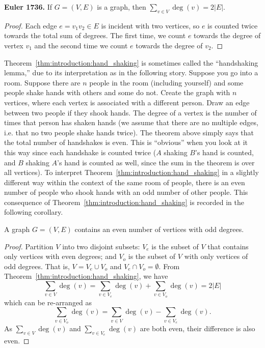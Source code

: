 \begin{theorem}
\label{thm:introduction:degree_sum}
\label{thm:introduction:hand_shaking}
\textbf{Euler 1736.}
If $G = (V, E)$ is a graph, then $\sum_{v \in V} \deg(v) = 2 |E|$.
\end{theorem}

\begin{proof}
Each edge $e = v_1 v_2 \in E$ is incident with two vertices, so $e$ is
counted twice towards the total sum of degrees. The first time, we
count $e$ towards the degree of vertex $v_1$ and the second time we
count $e$ towards the degree of $v_2$.
\end{proof}

Theorem~\ref{thm:introduction:hand_shaking} is sometimes called the
``handshaking lemma,'' due to its interpretation as in the following
story. Suppose you go into a room. Suppose there are $n$ people in the
room (including yourself) and some people shake hands with others and
some do not. Create the graph with $n$ vertices, where each vertex is
associated with a different person. Draw an edge between two people if
they shook hands. The degree of a vertex is the number of times that
person has shaken hands (we assume that there are no multiple edges,
i.e. that no two people shake hands twice). The theorem above simply
says that the total number of handshakes is even. This is ``obvious''
when you look at it this way since each handshake is counted twice
($A$ shaking $B$'s hand is counted, and $B$ shaking $A$'s hand is
counted as well, since the sum in the theorem is over all
vertices). To interpret Theorem~\ref{thm:introduction:hand_shaking} in
a slightly different way within the context of the same room of
people, there is an even number of people who shook hands with an odd
number of other people. This consequence of
Theorem~\ref{thm:introduction:hand_shaking} is recorded in the
following corollary.

\begin{corollary}
\label{cor:introduction:even_num_vertices_odd_degree}
A graph $G = (V, E)$ contains an even number of vertices with odd
degrees.
\end{corollary}

\begin{proof}
Partition $V$ into two disjoint subsets: $V_e$ is the subset of $V$
that contains only vertices with even degrees; and $V_o$ is the subset
of $V$ with only vertices of odd degrees. That is, $V = V_e \cup V_o$
and $V_e \cap V_o = \emptyset$. From
Theorem~\ref{thm:introduction:hand_shaking}, we have
\[
\sum_{v \in V} \deg(v)
=
\sum_{v \in V_e} \deg(v) + \sum_{v \in V_o} \deg(v)
=
2 |E|
\]
which can be re-arranged as
\[
\sum_{v \in V_o} \deg(v)
=
\sum_{v \in V} \deg(v) - \sum_{v \in V_e} \deg(v).
\]
As $\sum_{v \in V} \deg(v)$ and $\sum_{v \in V_e} \deg(v)$ are both
even, their difference is also even.
\end{proof}

